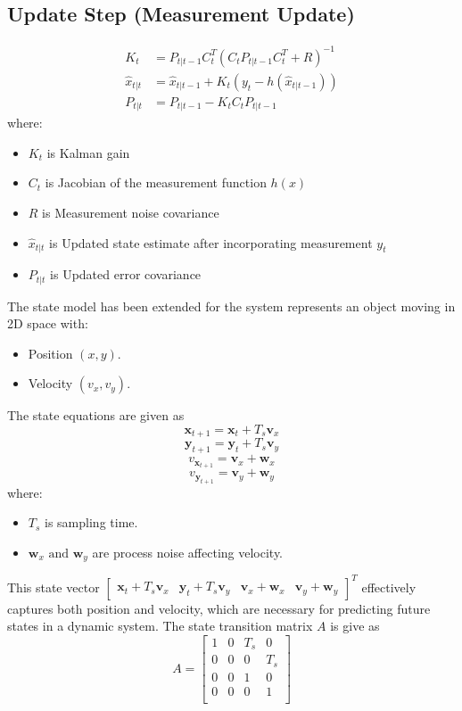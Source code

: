 \documentclass{article}
\begin{document}
\subsection*{Update Step (Measurement Update)}
\begin{align*}
K_t &= P_{t|t-1} C_t^T (C_t P_{t|t-1} C_t^T + R)^{-1} \\
\hat{x}_{t|t} &= \hat{x}_{t|t-1} + K_t \left( y_t - h(\hat{x}_{t|t-1}) \right) \\
P_{t|t} &= P_{t|t-1} - K_t C_t P_{t|t-1}
\end{align*}
where:
\begin{itemize}
    \item \( K_t \) is Kalman gain
    \item \( C_t \) is Jacobian of the measurement function \( h(x) \)
    \item \( R \) is Measurement noise covariance
    \item \( \hat{x}_{t|t} \) is Updated state estimate after incorporating measurement \( y_t \)
    \item \( P_{t|t} \) is Updated error covariance
\end{itemize}
The state model has been extended for the system represents an object moving in 2D space with:
\begin{itemize}
    \item Position \( (x,y) \).
    \item Velocity \( (v_x,v_y) \).
\end{itemize}
The state equations are given as
\[\mathbf{x}_{t+1} = \mathbf{x}_t + T_s \mathbf{v}_{x}\]
\[\mathbf{y}_{t+1} = \mathbf{y}_t + T_s \mathbf{v}_{y}\]
\[v_{\mathbf{x}_{t+1}} = \mathbf{v}_x + \mathbf{w}_{x}\]
\[v_{\mathbf{y}_{t+1}} = \mathbf{v}_y + \mathbf{w}_{y}\]
where:
\begin{itemize}
    \item \(T_s\) is sampling time.
    \item \(\mathbf{w}_{x} \text{ and } \mathbf{w}_{y}\) are process noise affecting velocity.
\end{itemize}
This state vector \(\begin{bmatrix}
    \mathbf{x}_t + T_s \mathbf{v}_{x} & \mathbf{y}_t + T_s \mathbf{v}_{y}
& \mathbf{v}_x + \mathbf{w}_{x}
& \mathbf{v}_y + \mathbf{w}_{y}
\end{bmatrix}^T\) effectively captures both position and velocity, which are necessary for predicting future states in a dynamic system. The state transition matrix \(A\) is give as
\[A = \begin{bmatrix}
    1 & 0 & T_s & 0 \\ 0 & 0 & 0 & T_s \\
0 & 0 & 1 & 0 \\ 0 & 0 & 0 & 1 \\ \end{bmatrix}\]
\end{document}
